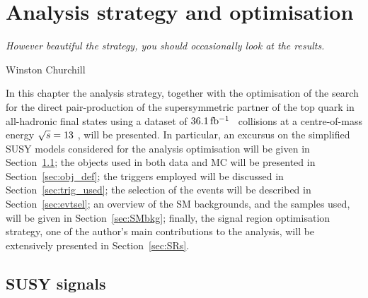 \chapter{Analysis strategy and optimisation}
\label{ch:stop_ana}
\epigraph{\emph{However beautiful the strategy, you should occasionally look at the results.}}{Winston Churchill}

	In this chapter the analysis strategy, together with the optimisation of the search for the direct pair-production of the supersymmetric partner of the top quark in all-hadronic final states using a dataset of $36.1\, \mbox{fb$^{-1}$}$ \pp\ collisions at a centre-of-mass energy $\sqrt{s} = 13$ \TeV, will be presented. In particular, an excursus on the simplified \ac{SUSY} models considered for the analysis optimisation will be given in Section~\ref{sec:susysig}; the objects used in both data and \ac{MC} will be presented in Section~\ref{sec:obj_def}; the triggers employed will be discussed in Section~\ref{sec:trig_used}; the selection of the events will be described in Section~\ref{sec:evtsel}; an overview of the \ac{SM} backgrounds, and the samples used, will be given in Section~\ref{sec:SMbkg}; finally, the signal region optimisation strategy, one of the author's main contributions to the analysis, will be extensively presented in Section~\ref{sec:SRs}.




	\section{SUSY signals}
	\label{sec:susysig}

